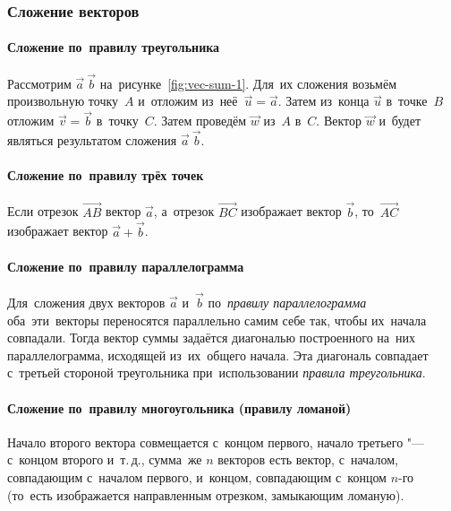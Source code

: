 \documentclass[]{scrartcl}
\begin{document}
\subsubsection{Сложение векторов}

\paragraph{Сложение по~правилу треугольника}

Рассмотрим ${\textstyle \vec{a}\ \vec{b}}$ на~рисунке~\ref{fig:vec-sum-1}. Для~их сложения возьмём произвольную точку~${\textstyle A}$ и~отложим из~неё~${\textstyle \vec{u} = \vec{a}}$. Затем из~конца ${\textstyle \vec{u}}$ в~точке~${\textstyle B}$ отложим ${\textstyle \vec{v} = \vec{b}}$ в~точку~${\textstyle C}$. Затем проведём ${\textstyle \vec{w}}$ из~${\textstyle A}$ в~${\textstyle C}$. Вектор ${\textstyle \vec{w}}$ и~будет являться результатом сложения ${\textstyle \vec{a}\ \vec{b}}$.

\paragraph{Сложение по~правилу трёх точек}

Если отрезок ${\textstyle {\overrightarrow {AB}}}$ вектор ${\textstyle {\vec {a}}}$, а~отрезок ${\textstyle {\overrightarrow {BC}}}$ изображает вектор ${\displaystyle {\vec {b}}}$, то~$ {\textstyle {\overrightarrow {AC}}}$ изображает вектор ${\textstyle {\vec {a}}+{\vec {b}}}$.

\paragraph{Сложение по~правилу параллелограмма}

Для~сложения двух векторов ${\textstyle {\vec {a}}}$ и~${\textstyle {\vec {b}}}$ по~\emph{правилу параллелограмма} оба~эти~векторы переносятся параллельно самим себе так, чтобы их~начала совпадали. Тогда вектор суммы задаётся диагональю построенного на~них параллелограмма, исходящей из~их~общего начала. Эта диагональ совпадает с~третьей стороной треугольника при~использовании \emph{правила треугольника}.

\paragraph{Сложение по~правилу многоугольника (правилу ломаной)}
Начало второго вектора совмещается с~концом первого, начало третьего "--- с~концом второго и~т.\,д., сумма~же ${\textstyle n}$ векторов есть вектор, с~началом, совпадающим с~началом первого, и~концом, совпадающим с~концом ${\textstyle n}$-го (то~есть изображается направленным отрезком, замыкающим ломаную).
 
\end{document}
